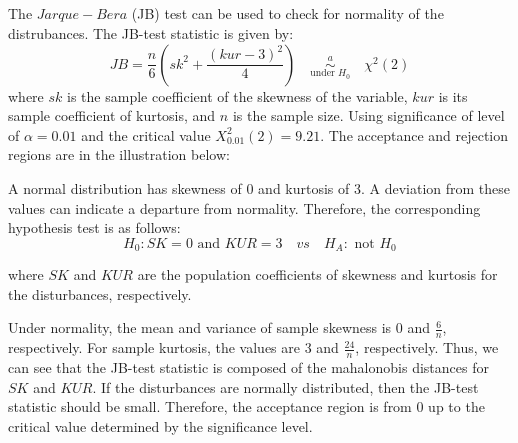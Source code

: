 \subsection{}

The $Jarque-Bera$ (JB) test can be used to check for normality of the distrubances. The JB-test statistic is given by:
$$JB = \dfrac{n}{6} \left( sk^2 + \dfrac{(kur-3)^2}{4} \right) \quad \overset{a}{\underset{\text{under }H_0}{\sim}} \quad \chi^2(2)$$
where $sk$ is the sample coefficient of the skewness of the variable, $kur$ is its sample coefficient of kurtosis, and $n$ is the sample size. Using significance of level of $\alpha = 0.01$ and the critical value $X^2_{0.01}(2) = 9.21$. The acceptance and rejection regions are in the illustration below:

\begin{center}
\end{center}

A normal distribution has skewness of 0 and kurtosis of 3.  A deviation from these values can indicate a departure from normality. Therefore, the corresponding hypothesis test is as follows:
$$
H_0: SK = 0 \text{ and } KUR = 3  \quad vs \quad H_A: \text{ not } H_0
$$

\noindent
where $SK$ and $KUR$ are the population coefficients of skewness and kurtosis for the disturbances, respectively. 

\medskip
\noindent
Under normality, the mean and variance of sample skewness is 0 and $\frac{6}{n}$, respectively. For sample kurtosis, the values are 3 and $\frac{24}{n}$, respectively. Thus, we can see that the JB-test statistic is composed of the mahalonobis distances for $SK$ and $KUR$. If the disturbances are normally distributed, then the JB-test statistic should be small. Therefore, the acceptance region is from 0 up to the critical value determined by the significance level.
